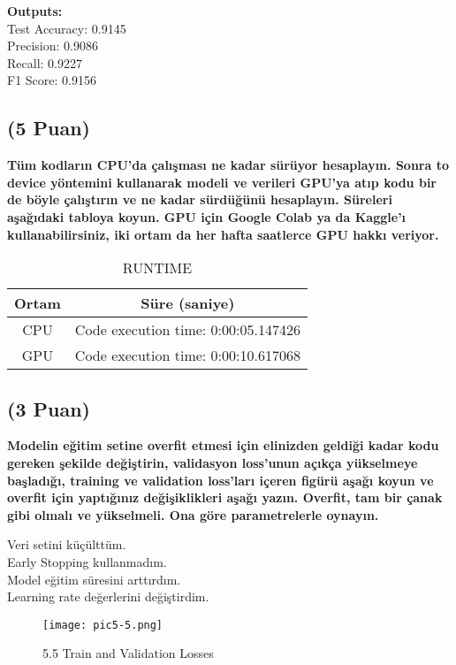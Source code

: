 \documentclass[11pt]{article}
\begin{document}
\textbf{Outputs:} \\
Test Accuracy: 0.9145 \\
Precision: 0.9086 \\
Recall: 0.9227 \\
F1 Score: 0.9156

\subsection{(5 Puan)} \textbf{Tüm kodların CPU'da çalışması ne kadar sürüyor hesaplayın. Sonra to device yöntemini kullanarak modeli ve verileri GPU'ya atıp kodu bir de böyle çalıştırın ve ne kadar sürdüğünü hesaplayın. Süreleri aşağıdaki tabloya koyun. GPU için Google Colab ya da Kaggle'ı kullanabilirsiniz, iki ortam da her hafta saatlerce GPU hakkı veriyor.}

\begin{table}[ht!]
    \centering
    \caption{RUNTIME}
    \begin{tabular}{c|c}
        Ortam & Süre (saniye) \\\hline
        CPU & Code execution time: 0:00:05.147426 \\
        GPU & Code execution time: 0:00:10.617068 \\
    \end{tabular}
    \label{tab:my_table}
\end{table}

\subsection{(3 Puan)} \textbf{Modelin eğitim setine overfit etmesi için elinizden geldiği kadar kodu gereken şekilde değiştirin, validasyon loss'unun açıkça yükselmeye başladığı, training ve validation loss'ları içeren figürü aşağı koyun ve overfit için yaptığınız değişiklikleri aşağı yazın. Overfit, tam bir çanak gibi olmalı ve yükselmeli. Ona göre parametrelerle oynayın.}

Veri setini küçülttüm. \\
Early Stopping kullanmadım. \\
Model eğitim süresini arttırdım. \\
Learning rate değerlerini değiştirdim. 


\begin{figure}[ht!]
    \centering
    \texttt{[image: pic5-5.png]}
    \caption{5.5 Train and Validation Losses}
    \label{fig:my_pic}
\end{figure}
\end{document}
